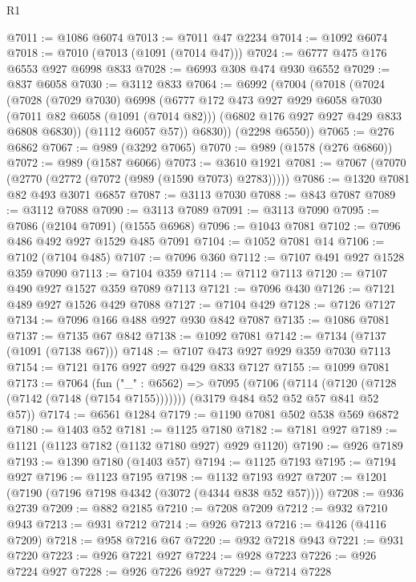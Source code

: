 \begin{lexlean}{R1}
\begin{coremodule}
@7011 := @1086 @6074
@7013 := @7011 @47 @2234
@7014 := @1092 @6074
@7018 := @7010 (@7013 (@1091 (@7014 @47)))
@7024 := @6777 @475 @176 @6553 @927 @6998 @833
@7028 := @6993 @308 @474 @930 @6552
@7029 := @837 @6058
@7030 := @3112 @833
@7064 := @6992
    (@7004
      (@7018
        (@7024
          (@7028
            (@7029 @7030)
            @6998
            (@6777
              @172
              @473
              @927
              @929
              @6058
              @7030
              (@7011 @82 @6058 (@1091 (@7014 @82)))
              (@6802 @176 @927 @927 @429 @833 @6808 @6830))
            (@1112 @6057 @57))
          @6830))
      (@2298 @6550))
@7065 := @276 @6862
@7067 := @989 (@3292 @7065)
@7070 := @989 (@1578 (@276 @6860))
@7072 := @989 (@1587 @6066)
@7073 := @3610 @1921
@7081 := @7067 (@7070 (@2770 (@2772 (@7072 (@989 (@1590 @7073) @2783)))))
@7086 := @1320 @7081 @82 @493 @3071 @6857
@7087 := @3113 @7030
@7088 := @843 @7087
@7089 := @3112 @7088
@7090 := @3113 @7089
@7091 := @3113 @7090
@7095 := @7086 (@2104 @7091) (@1555 @6968)
@7096 := @1043 @7081
@7102 := @7096 @486 @492 @927 @1529 @485 @7091
@7104 := @1052 @7081 @14
@7106 := @7102 (@7104 @485)
@7107 := @7096 @360
@7112 := @7107 @491 @927 @1528 @359 @7090
@7113 := @7104 @359
@7114 := @7112 @7113
@7120 := @7107 @490 @927 @1527 @359 @7089 @7113
@7121 := @7096 @430
@7126 := @7121 @489 @927 @1526 @429 @7088
@7127 := @7104 @429
@7128 := @7126 @7127
@7134 := @7096 @166 @488 @927 @930 @842 @7087
@7135 := @1086 @7081
@7137 := @7135 @67 @842
@7138 := @1092 @7081
@7142 := @7134 (@7137 (@1091 (@7138 @67)))
@7148 := @7107 @473 @927 @929 @359 @7030 @7113
@7154 := @7121 @176 @927 @927 @429 @833 @7127
@7155 := @1099 @7081
@7173 := @7064
    (fun ("_" : @6562) =>
    @7095
      (@7106 (@7114 (@7120 (@7128 (@7142 (@7148 (@7154 @7155)))))))
      (@3179 @484 @52 @52 @57 @841 @52 @57))
@7174 := @6561 @1284
@7179 := @1190 @7081 @502 @538 @569 @6872
@7180 := @1403 @52
@7181 := @1125 @7180
@7182 := @7181 @927
@7189 := @1121 (@1123 @7182 (@1132 @7180 @927) @929 @1120)
@7190 := @926 @7189
@7193 := @1390 @7180 (@1403 @57)
@7194 := @1125 @7193
@7195 := @7194 @927
@7196 := @1123 @7195
@7198 := @1132 @7193 @927
@7207 := @1201 (@7190 (@7196 @7198 @4342 (@3072 (@4344 @838 @52 @57))))
@7208 := @936 @2739
@7209 := @882 @2185
@7210 := @7208 @7209
@7212 := @932 @7210 @943
@7213 := @931 @7212
@7214 := @926 @7213
@7216 := @4126 (@4116 @7209)
@7218 := @958 @7216 @67
@7220 := @932 @7218 @943
@7221 := @931 @7220
@7223 := @926 @7221 @927
@7224 := @928 @7223
@7226 := @926 @7224 @927
@7228 := @926 @7226 @927
@7229 := @7214 @7228

\end{coremodule}
\end{lexlean}

